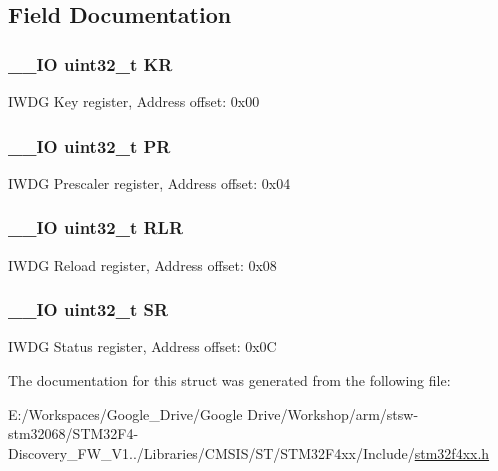 \subsection{Field Documentation}
\hypertarget{struct_i_w_d_g___type_def_a2f692354bde770f2a5e3e1b294ec064b}{
\subsubsection[{K\-R}]{\setlength{\rightskip}{0pt plus 5cm}\-\_\-\-\_\-\-I\-O uint32\-\_\-t K\-R}}\label{struct_i_w_d_g___type_def_a2f692354bde770f2a5e3e1b294ec064b}
I\-W\-D\-G Key register, Address offset\-: 0x00 \hypertarget{struct_i_w_d_g___type_def_af8d25514079514d38c104402f46470af}{
\subsubsection[{P\-R}]{\setlength{\rightskip}{0pt plus 5cm}\-\_\-\-\_\-\-I\-O uint32\-\_\-t P\-R}}\label{struct_i_w_d_g___type_def_af8d25514079514d38c104402f46470af}
I\-W\-D\-G Prescaler register, Address offset\-: 0x04 \hypertarget{struct_i_w_d_g___type_def_a7015e1046dbd3ea8783b33dc11a69e52}{
\subsubsection[{R\-L\-R}]{\setlength{\rightskip}{0pt plus 5cm}\-\_\-\-\_\-\-I\-O uint32\-\_\-t R\-L\-R}}\label{struct_i_w_d_g___type_def_a7015e1046dbd3ea8783b33dc11a69e52}
I\-W\-D\-G Reload register, Address offset\-: 0x08 \hypertarget{struct_i_w_d_g___type_def_af6aca2bbd40c0fb6df7c3aebe224a360}{
\subsubsection[{S\-R}]{\setlength{\rightskip}{0pt plus 5cm}\-\_\-\-\_\-\-I\-O uint32\-\_\-t S\-R}}\label{struct_i_w_d_g___type_def_af6aca2bbd40c0fb6df7c3aebe224a360}
I\-W\-D\-G Status register, Address offset\-: 0x0\-C 

The documentation for this struct was generated from the following file\-:\begin{DoxyCompactItemize}
\item 
E\-:/\-Workspaces/\-Google\-\_\-\-Drive/\-Google Drive/\-Workshop/arm/stsw-\/stm32068/\-S\-T\-M32\-F4-\/\-Discovery\-\_\-\-F\-W\-\_\-\-V1../\-Libraries/\-C\-M\-S\-I\-S/\-S\-T/\-S\-T\-M32\-F4xx/\-Include/\hyperlink{stm32f4xx_8h}{stm32f4xx.\-h}\end{DoxyCompactItemize}
